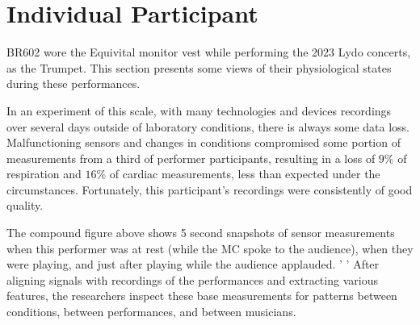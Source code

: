\section*{Individual Participant}
 BR602 wore the Equivital monitor vest while performing the 2023 Lydo concerts,  as the Trumpet. This section presents some views of their physiological states during these performances.

In an experiment of this scale, with many technologies and devices recordings over several days outside of laboratory conditions, there is always some data loss.  Malfunctioning sensors and changes in conditions compromised some portion of measurements from a third of performer participants, resulting in a loss of $9\%$ of respiration and $16\%$ of cardiac measurements, less than expected under the circumstances.  Fortunately, this participant’s recordings were consistently of good quality.


The compound figure above shows 5 second snapshots of sensor measurements when this performer was at rest (while the MC spoke to the audience), when they were playing, and just after playing while the audience applauded. ' ' After aligning signals with recordings of the performances and extracting various features, the researchers inspect these base measurements for patterns between conditions, between performances, and between musicians. 


